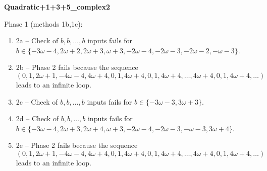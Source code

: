 \begin{exmp}
\label{ex:compareAO}

\textbf{Quadratic+1+3+5\_complex2 }

Phase 1 (methods 1b,\allowbreak  1c):
\begin{enumerate}[ ]
\item  2a -- Check of $b,\allowbreak b,\allowbreak \dots,\allowbreak b$ inputs fails for $b\in \{-3\omega - 4,\allowbreak  2\omega + 2,\allowbreak  2\omega + 3,\allowbreak  \omega + 3,\allowbreak  -2\omega - 4,\allowbreak  -2\omega - 3,\allowbreak  -2\omega - 2,\allowbreak  -\omega - 3\}$.
\item  2b -- Phase 2   fails because  the sequence $(0,\allowbreak  1,\allowbreak  2\omega + 1,\allowbreak  -4\omega - 4,\allowbreak  4\omega + 4,\allowbreak  0,\allowbreak  1,\allowbreak  4\omega + 4,\allowbreak  0,\allowbreak  1,\allowbreak  4\omega + 4,\allowbreak  \dots ,\allowbreak 4\omega + 4,\allowbreak  0,\allowbreak  1,\allowbreak  4\omega + 4,\allowbreak  \dots)$ leads to an infinite loop.
\item  2c -- Check of $b,\allowbreak b,\allowbreak \dots,\allowbreak b$ inputs fails for $b\in \{-3\omega - 3,\allowbreak  3\omega + 3\}$.
\item  2d -- Check of $b,\allowbreak b,\allowbreak \dots,\allowbreak b$ inputs fails for $b\in \{-3\omega - 4,\allowbreak  2\omega + 3,\allowbreak  2\omega + 4,\allowbreak  \omega + 3,\allowbreak  -2\omega - 4,\allowbreak  -2\omega - 3,\allowbreak  -\omega - 3,\allowbreak  3\omega + 4\}$.
\item  2e -- Phase 2   fails because  the sequence $(0,\allowbreak  1,\allowbreak  2\omega + 1,\allowbreak  -4\omega - 4,\allowbreak  4\omega + 4,\allowbreak  0,\allowbreak  1,\allowbreak  4\omega + 4,\allowbreak  0,\allowbreak  1,\allowbreak  4\omega + 4,\allowbreak  \dots ,\allowbreak 4\omega + 4,\allowbreak  0,\allowbreak  1,\allowbreak  4\omega + 4,\allowbreak  \dots)$ leads to an infinite loop.
\end{enumerate}



\end{exmp}
